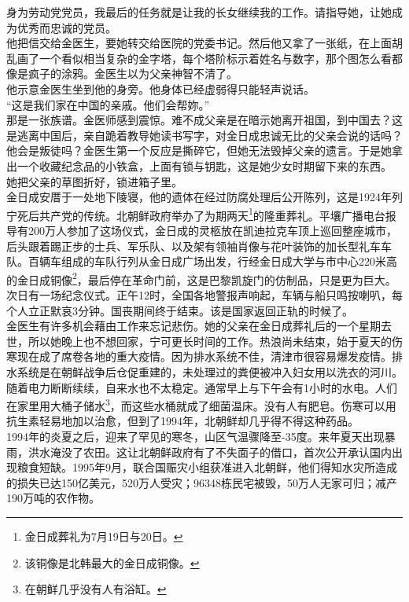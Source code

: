 身为劳动党党员，我最后的任务就是让我的长女继续我的工作。请指导她，让她成为优秀而忠诚的党员。\\

他把信交给金医生，要她转交给医院的党委书记。然后他又拿了一张纸，在上面胡乱画了一个看似相当复杂的金字塔，每个塔阶标示着姓名与数字，那个图怎么看都像是疯子的涂鸦。金医生以为父亲神智不清了。\\

他示意金医生坐到他的身旁。他身体已经虚弱得只能轻声说话。\\

“这是我们家在中国的亲戚。他们会帮妳。”\\

那是一张族谱。金医师感到震惊。难不成父亲是在暗示她离开祖国，到中国去？这是逃离中国后，亲自跪着教导她读书写字，对金日成忠诚无比的父亲会说的话吗？他会是叛徒吗？金医生第一个反应是撕碎它，但她无法毁掉父亲的遗言。于是她拿出一个收藏纪念品的小铁盒，上面有锁与钥匙，这是她少女时期留下来的东西。\\

她把父亲的草图折好，锁进箱子里。\\

金日成安厝于一处地下陵寝，他的遗体在经过防腐处理后公开陈列，这是1924年列宁死后共产党的传统。北朝鲜政府举办了为期两天\footnote{金日成葬礼为7月19日与20日。}的隆重葬礼。平壤广播电台报导有200万人参加了这场仪式，金日成的灵柩放在凯迪拉克车顶上巡回整座城市，后头跟着踢正步的士兵、军乐队、以及架有领袖肖像与花叶装饰的加长型礼车车队。百辆车组成的车队行列从金日成广场出发，行经金日成大学与市中心220米高的金日成铜像\footnote{该铜像是北韩最大的金日成铜像。}，最后停在革命门前，这是巴黎凯旋门的仿制品，只是更为巨大。次日有一场纪念仪式。正午12时，全国各地警报声响起，车辆与船只鸣按喇叭，每个人立正默哀3分钟。国丧期间终于结束。该是国家返回正轨的时候了。\\

金医生有许多机会藉由工作来忘记悲伤。她的父亲在金日成葬礼后的一个星期去世，所以她晚上也不想回家，宁可更长时间的工作。热浪尚未结束，始于夏天的伤寒现在成了席卷各地的重大疫情。因为排水系统不佳，清津市很容易爆发疫情。排水系统是在朝鲜战争后仓促重建的，未处理过的粪便被冲入妇女用以洗衣的河川。随着电力断断续续，自来水也不太稳定。通常早上与下午会有1小时的水电。人们在家里用大桶子储水\footnote{在朝鲜几乎没有人有浴缸。}，而这些水桶就成了细菌温床。没有人有肥皂。伤寒可以用抗生素轻易地加以治愈，但到了1994年，北朝鲜却几乎得不得这种药品。\\

1994年的炎夏之后，迎来了罕见的寒冬，山区气温骤降至-35度。来年夏天出现暴雨，洪水淹没了农田。这让北朝鲜政府有了不失面子的借口，首次公开承认国内出现粮食短缺。1995年9月，联合国赈灾小组获准进入北朝鲜，他们得知水灾所造成的损失已达150亿美元，520万人受灾；96348栋民宅被毁，50万人无家可归；减产190万吨的农作物。\\

